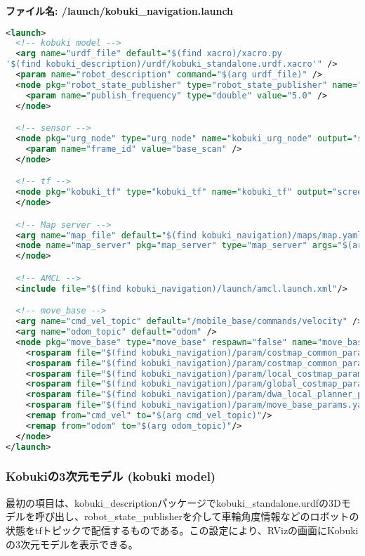 \textbf{ファイル名: /launch/kobuki\_navigation.launch}
\begin{lstlisting}[language=XML]
<launch>
  <!-- kobuki model -->
  <arg name="urdf_file" default="$(find xacro)/xacro.py
'$(find kobuki_description)/urdf/kobuki_standalone.urdf.xacro'" />
  <param name="robot_description" command="$(arg urdf_file)" />
  <node pkg="robot_state_publisher" type="robot_state_publisher" name="robot_state_publisher" output="screen">
    <param name="publish_frequency" type="double" value="5.0" />
  </node>

  <!-- sensor -->
  <node pkg="urg_node" type="urg_node" name="kobuki_urg_node" output="screen">
    <param name="frame_id" value="base_scan" />
  </node>

  <!-- tf -->
  <node pkg="kobuki_tf" type="kobuki_tf" name="kobuki_tf" output="screen">
  </node>

  <!-- Map server -->
  <arg name="map_file" default="$(find kobuki_navigation)/maps/map.yaml"/>
  <node name="map_server" pkg="map_server" type="map_server" args="$(arg map_file)">
  </node>

  <!-- AMCL -->
  <include file="$(find kobuki_navigation)/launch/amcl.launch.xml"/>

  <!-- move_base -->
  <arg name="cmd_vel_topic" default="/mobile_base/commands/velocity" />
  <arg name="odom_topic" default="odom" />
  <node pkg="move_base" type="move_base" respawn="false" name="move_base" output="screen">
    <rosparam file="$(find kobuki_navigation)/param/costmap_common_params.yaml" command="load" ns="global_costmap" />
    <rosparam file="$(find kobuki_navigation)/param/costmap_common_params.yaml" command="load" ns="local_costmap" />
    <rosparam file="$(find kobuki_navigation)/param/local_costmap_params.yaml" command="load" />
    <rosparam file="$(find kobuki_navigation)/param/global_costmap_params.yaml" command="load" />
    <rosparam file="$(find kobuki_navigation)/param/dwa_local_planner_params.yaml" command="load" />
    <rosparam file="$(find kobuki_navigation)/param/move_base_params.yaml" command="load" />
    <remap from="cmd_vel" to="$(arg cmd_vel_topic)"/>
    <remap from="odom" to="$(arg odom_topic)"/>
  </node>
</launch>
\end{lstlisting}

\subsubsection{Kobukiの3次元モデル (kobuki model)}

最初の項目は、kobuki\_descriptionパッケージでkobuki\_standalone.urdfの3Dモデルを呼び出し、robot\_state\_publisherを介して車輪角度情報などのロボットの状態をtfトピックで配信するものである。この設定により、RVizの画面にKobukiの3次元モデルを表示できる。

